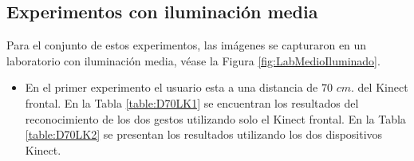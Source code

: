 \subsection{Experimentos con iluminación media} 
Para el conjunto de estos experimentos, las imágenes se capturaron en un laboratorio con iluminación media, véase la Figura \ref{fig:LabMedioIluminado}.

\begin{itemize}

\item En el primer experimento el usuario esta a una distancia de $70$ $cm.$ del Kinect frontal. En la Tabla \ref{table:D70LK1} se encuentran los resultados del reconocimiento de los dos gestos utilizando solo el Kinect frontal. En la Tabla \ref{table:D70LK2} se presentan los resultados utilizando los dos dispositivos Kinect.  

%


\end{itemize}

